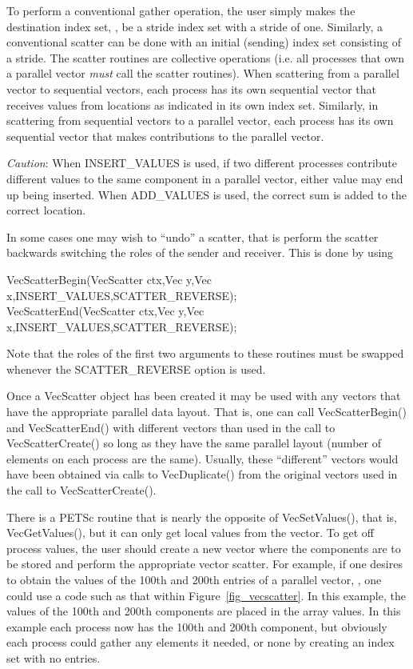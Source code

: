 To perform a conventional gather operation, the user simply makes
 the destination index set,
, be a stride index set with a stride of one.  Similarly, a
conventional scatter can be done with an initial (sending) index set
consisting of a stride.  The scatter routines are collective operations
(i.e. all processes that own
a parallel vector {\em must} call the scatter routines). When scattering from a
parallel vector to sequential vectors, each process has its own sequential
vector that receives values from locations as indicated in its own
index set. Similarly, in scattering
from sequential vectors to a parallel vector, each process has its
own sequential vector that makes contributions to the parallel vector.

{\em Caution}: When INSERT\_VALUES is used, if two different
processes contribute different values to the same component in a
parallel vector, either value may end up being inserted. When
ADD\_VALUES is used, the correct sum is added to the correct
location.

In some cases one may wish to ``undo'' a scatter, that is perform the
scatter backwards switching the roles of the sender and receiver. This is
done by using
\begin{tabbing}
  VecScatterBegin(VecScatter ctx,Vec y,Vec x,INSERT\_VALUES,SCATTER\_REVERSE);\\
  VecScatterEnd(VecScatter ctx,Vec y,Vec x,INSERT\_VALUES,SCATTER\_REVERSE);
\end{tabbing}
Note that the roles of the first
two arguments to these routines must be swapped whenever the SCATTER\_REVERSE
option is used.

Once a VecScatter object has been created it may be used with any vectors
that have the appropriate parallel data layout. That is, one can call
VecScatterBegin() and VecScatterEnd() with different vectors than
used in the call to VecScatterCreate() so long as they have the same
parallel layout (number of elements on each process are the same). Usually,
these ``different'' vectors would have been obtained via calls to
VecDuplicate() from the original vectors used in the call to
VecScatterCreate().

There is a PETSc routine that is nearly the opposite of VecSetValues(), that is, VecGetValues(), but it can only get
local values from the vector.
To get off process values, the user should create a new vector where
the components are to be stored and perform the appropriate vector
scatter. For example, if one desires to obtain the values of the
100th and 200th entries of a parallel vector, , one could use
a code such as that within Figure~\ref{fig_vecscatter}.
In this example, the values of the 100th and 200th components are
placed in the array
values. In this example each process now has the 100th and
200th component, but obviously each process could gather any
elements it needed, or none by creating an index set with no entries.

